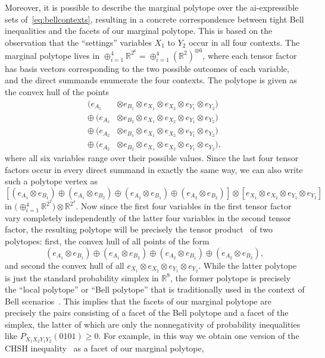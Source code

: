 \documentclass[aps,english,10pt,superscriptaddress,onecolumn,twoside,longbibliography,pra,floatfix,fleqn,nofootinbib]{revtex4-1}
\theoremstyle{definition}
\newcounter{example}[section]
\begin{document}
Moreover, it is possible to describe the marginal polytope over the ai-expressible sets of~\cref{eq:bellcontexts}, resulting in a concrete correspondence between tight Bell inequalities and the facets of our marginal polytope. This is based on the observation that the ``settings'' variables $X_1$ to $Y_2$ occur in all four contexts. The marginal polytope lives in $\oplus_{i=1}^4 \mathbb{R}^{2^6} = \oplus_{i=1}^4 (\mathbb{R}^2)^{\otimes 6}$, where each tensor factor has basis vectors corresponding to the two possible outcomes of each variable, and the direct summands enumerate the four contexts. The polytope is given as the convex hull of the points
\begin{align*}
	(e_{A_1} & \otimes e_{B_1} \otimes e_{X_1} \otimes e_{X_2} \otimes e_{Y_1} \otimes e_{Y_2}) \\
	\oplus\: (e_{A_1} & \otimes e_{B_2} \otimes e_{X_1} \otimes e_{X_2} \otimes e_{Y_1} \otimes e_{Y_2}) \\
	\oplus\: (e_{A_2} & \otimes e_{B_1} \otimes e_{X_1} \otimes e_{X_2} \otimes e_{Y_1} \otimes e_{Y_2}) \\
	\oplus\: (e_{A_2} & \otimes e_{B_2} \otimes e_{X_1} \otimes e_{X_2} \otimes e_{Y_1} \otimes e_{Y_2}),
\end{align*}
where all six variables range over their possible values. Since the last four tensor factors occur in every direct summand in exactly the same way, we can also write such a polytope vertex as
\[
	\left[ (e_{A_1} \otimes e_{B_1}) \oplus (e_{A_1} \otimes e_{B_2}) \oplus (e_{A_2} \otimes e_{B_1}) \oplus (e_{A_2} \otimes e_{B_2})\right] \otimes \left[ e_{X_1} \otimes e_{X_2} \otimes e_{Y_1} \otimes e_{Y_2}\right]
\]
in $\big(\oplus_{i=1}^4 \mathbb{R}^{2^2}\big)\otimes \mathbb{R}^{2^4}$. Now since the first four variables in the first tensor factor vary completely independently of the latter four variables in the second tensor factor, the resulting polytope will be precisely the tensor product~\cite{namioka_tensor_1969,bogart_hom_2013} of two polytopes: first, the convex hull of all points of the form
\[
	(e_{A_1} \otimes e_{B_1}) \oplus (e_{A_1} \otimes e_{B_2}) \oplus (e_{A_2} \otimes e_{B_1}) \oplus (e_{A_2} \otimes e_{B_2}),
\]
and second the convex hull of all $e_{X_1} \otimes e_{X_2} \otimes e_{Y_1} \otimes e_{Y_2}$. While the latter polytope is just the standard probability simplex in $\mathbb{R}^8$, the former polytope is precisely the ``local polytope'' or ``Bell polytope'' that is traditionally used in the context of Bell scenarios~\cite[Sec.~II.B]{Brunner2013Bell}. This implies that the facets of our marginal polytope are precisely the pairs consisting of a facet of the Bell polytope and a facet of the simplex, the latter of which are only the nonnegativity of probability inequalities like $P_{X_1X_2Y_1Y_2}(0101)\geq 0$. For example, in this way we obtain one version of the CHSH inequality~\cite{CHSHOriginal} as a facet of our marginal polytope,
\end{document}
